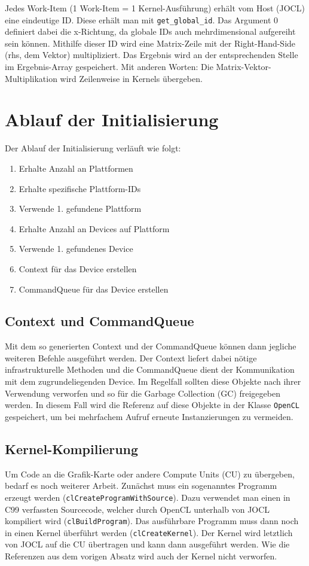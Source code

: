 \documentclass[
	ngerman,
	ruledheaders=section,
	class=report,
	thesis={type=Dokumentation},
	ignore-missing-data=true,
	accentcolor=9c,
	custommargins=false,
	marginpar=false,
	parskip=half-,
	fontsize=11pt,
]{tudapub}
\let\code\texttt
\def\code#1{\texttt{#1}}
\begin{document}
Jedes Work-Item (1 Work-Item = 1 Kernel-Ausführung) erhält vom Host (JOCL) eine eindeutige ID. Diese erhält man mit \code{get\_global\_id}. Das Argument 0 definiert dabei die x-Richtung, da globale IDs auch mehrdimensional aufgereiht sein können. Mithilfe dieser ID wird eine Matrix-Zeile mit der Right-Hand-Side (rhs, dem Vektor) multipliziert. Das Ergebnis wird an der entsprechenden Stelle im Ergebnis-Array gespeichert. Mit anderen Worten: Die Matrix-Vektor-Multiplikation wird Zeilenweise in Kernels übergeben.

\section{Ablauf der Initialisierung}
Der Ablauf der Initialisierung verläuft wie folgt:
\begin{enumerate}
	\item Erhalte Anzahl an Plattformen
	\item Erhalte spezifische Plattform-IDs
	\item Verwende 1. gefundene Plattform
	\item Erhalte Anzahl an Devices auf Plattform
	\item Verwende 1. gefundenes Device
	\item Context für das Device erstellen
	\item CommandQueue für das Device erstellen	
\end{enumerate}

\subsection{Context und CommandQueue}
Mit dem so generierten Context und der CommandQueue können dann jegliche weiteren Befehle ausgeführt werden. Der Context liefert dabei nötige infrastrukturelle Methoden und die CommandQueue dient der Kommunikation mit dem zugrundeliegenden Device. Im Regelfall sollten diese Objekte nach ihrer Verwendung verworfen und so für die Garbage Collection (GC) freigegeben werden. In diesem Fall wird die Referenz auf diese Objekte in der Klasse \code{OpenCL} gespeichert, um bei mehrfachem Aufruf erneute Instanzierungen zu vermeiden.

\subsection{Kernel-Kompilierung}
Um Code an die Grafik-Karte oder andere Compute Units (CU) zu übergeben, bedarf es noch weiterer Arbeit. Zunächst muss ein sogenanntes Programm erzeugt werden (\code{clCreateProgramWithSource}). Dazu verwendet man einen in C99 verfassten Sourcecode, welcher durch OpenCL unterhalb von JOCL kompiliert wird (\code{clBuildProgram}). Das ausführbare Programm muss dann noch in einen Kernel überführt werden (\code{clCreateKernel}). Der Kernel wird letztlich von JOCL auf die CU übertragen und kann dann ausgeführt werden. Wie die Referenzen aus dem vorigen Absatz wird auch der Kernel nicht verworfen.
\end{document}
